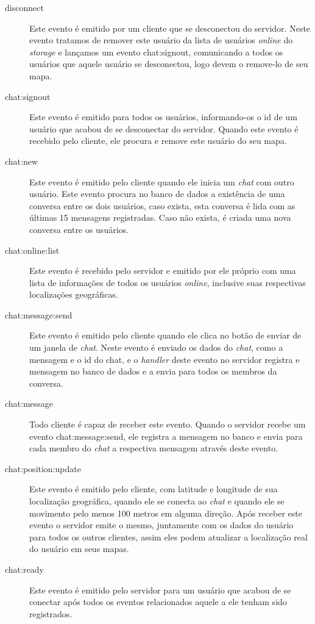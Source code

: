 \begin{description}
	\item[disconnect] Este evento é emitido por um cliente que se desconectou do servidor. Neste evento tratamos de remover este usuário da lista de usuários \textit{online} do \textit{storage} e lançamos um evento chat:signout, comunicando a todos os usuários que aquele usuário se desconectou, logo devem o remove-lo de seu mapa.
	
	\item[chat:signout] Este evento é emitido para todos os usuários, informando-os o id de um usuário que acabou de se desconectar do servidor. Quando este evento é recebido pelo cliente, ele procura e remove este usuário do seu mapa.
	
	\item[chat:new] Este evento é emitido pelo cliente quando ele inicia um \textit{chat} com outro usuário. Este evento procura no banco de dados a existência de uma conversa entre os dois usuários, caso exista, esta conversa é lida com as últimas 15 mensagens registradas. Caso não exista, é criada uma nova conversa entre os usuários.
	
	\item[chat:online:list] Este evento é recebido pelo servidor e emitido por ele próprio com uma lista de informações de todos os usuários \textit{online}, inclusive suas respectivas localizações geográficas.
	
	\item[chat:message:send] Este evento é emitido pelo cliente quando ele clica no botão de enviar de um janela de \textit{chat}. Neste evento é enviado os dados do \textit{chat}, como a mensagem e o id do chat, e o \textit{handler} deste evento no servidor registra e mensagem no banco de dados e a envia para todos os membros da conversa.
	
	\item[chat:message] Todo cliente é capaz de receber este evento. Quando o servidor recebe um evento chat:message:send, ele registra a mensagem no banco e envia para cada membro do \textit{chat} a respectiva mensagem através deste evento.
	
	\item[chat:position:update] Este evento é emitido pelo cliente, com latitude e longitude de sua localização geográfica, quando ele se conecta ao \textit{chat} e quando ele se movimento pelo menos 100 metros em alguma direção. Após receber este evento o servidor emite o mesmo, juntamente com os dados do usuário para todos os outros clientes, assim eles podem atualizar a localização real do usuário em seus mapas.
	
	\item[chat:ready] Este evento é emitido pelo servidor para um usuário que acabou de se conectar após todos os eventos relacionados aquele a ele tenham sido registrados.
\end{description}

